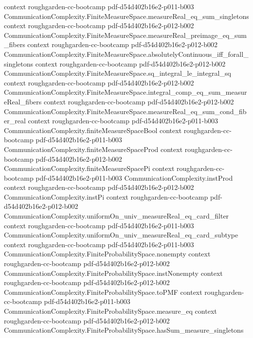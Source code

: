\begin{theorem}
  {context}
  {roughgarden-cc-bootcamp}
  {pdf-d54d402b16e2-p011-b003}
\proofstep
  {CommunicationComplexity.FiniteMeasureSpace.measureReal_eq_sum_singletons}
  {context}
  {roughgarden-cc-bootcamp}
  {pdf-d54d402b16e2-p012-b002}
\proofstep
  {CommunicationComplexity.FiniteMeasureSpace.measureReal_preimage_eq_sum_fibers}
  {context}
  {roughgarden-cc-bootcamp}
  {pdf-d54d402b16e2-p012-b002}
\proofstep
  {CommunicationComplexity.FiniteMeasureSpace.absolutelyContinuous_iff_forall_singletons}
  {context}
  {roughgarden-cc-bootcamp}
  {pdf-d54d402b16e2-p012-b002}
\proofstep
  {CommunicationComplexity.FiniteMeasureSpace.sq_integral_le_integral_sq}
  {context}
  {roughgarden-cc-bootcamp}
  {pdf-d54d402b16e2-p012-b002}
\proofstep
  {CommunicationComplexity.FiniteMeasureSpace.integral_comp_eq_sum_measureReal_fibers}
  {context}
  {roughgarden-cc-bootcamp}
  {pdf-d54d402b16e2-p012-b002}
\proofstep
  {CommunicationComplexity.FiniteMeasureSpace.measureReal_eq_sum_cond_fiber_real}
  {context}
  {roughgarden-cc-bootcamp}
  {pdf-d54d402b16e2-p011-b003}
\proofstep
  {CommunicationComplexity.finiteMeasureSpaceBool}
  {context}
  {roughgarden-cc-bootcamp}
  {pdf-d54d402b16e2-p011-b003}
\proofstep
  {CommunicationComplexity.finiteMeasureSpaceProd}
  {context}
  {roughgarden-cc-bootcamp}
  {pdf-d54d402b16e2-p012-b002}
\proofstep
  {CommunicationComplexity.finiteMeasureSpacePi}
  {context}
  {roughgarden-cc-bootcamp}
  {pdf-d54d402b16e2-p011-b003}
\proofstep
  {CommunicationComplexity.instProd}
  {context}
  {roughgarden-cc-bootcamp}
  {pdf-d54d402b16e2-p012-b002}
\proofstep
  {CommunicationComplexity.instPi}
  {context}
  {roughgarden-cc-bootcamp}
  {pdf-d54d402b16e2-p012-b002}
\proofstep
  {CommunicationComplexity.uniformOn_univ_measureReal_eq_card_filter}
  {context}
  {roughgarden-cc-bootcamp}
  {pdf-d54d402b16e2-p011-b003}
\proofstep
  {CommunicationComplexity.uniformOn_univ_measureReal_eq_card_subtype}
  {context}
  {roughgarden-cc-bootcamp}
  {pdf-d54d402b16e2-p011-b003}
\proofstep
  {CommunicationComplexity.FiniteProbabilitySpace.nonempty}
  {context}
  {roughgarden-cc-bootcamp}
  {pdf-d54d402b16e2-p012-b002}
\proofstep
  {CommunicationComplexity.FiniteProbabilitySpace.instNonempty}
  {context}
  {roughgarden-cc-bootcamp}
  {pdf-d54d402b16e2-p012-b002}
\proofstep
  {CommunicationComplexity.FiniteProbabilitySpace.toPMF}
  {context}
  {roughgarden-cc-bootcamp}
  {pdf-d54d402b16e2-p011-b003}
\proofstep
  {CommunicationComplexity.FiniteProbabilitySpace.measure_eq}
  {context}
  {roughgarden-cc-bootcamp}
  {pdf-d54d402b16e2-p012-b002}
\proofstep
  {CommunicationComplexity.FiniteProbabilitySpace.hasSum_measure_singletons}

\end{theorem}
